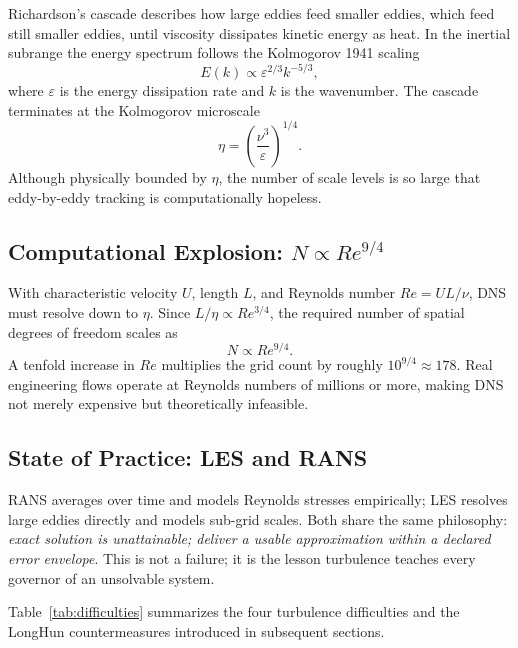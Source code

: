 \documentclass[10pt,a4paper]{article}
\theoremstyle{definition}
\begin{document}
Richardson's cascade describes how large eddies feed smaller eddies, which feed still smaller eddies, until viscosity dissipates kinetic energy as heat. In the inertial subrange the energy spectrum follows the Kolmogorov 1941 scaling\cite{Kolmogorov1941}
\begin{equation}\label{eq:K41}
E(k) \propto \varepsilon^{2/3} k^{-5/3},
\end{equation}
where $\varepsilon$ is the energy dissipation rate and $k$ is the wavenumber. The cascade terminates at the Kolmogorov microscale
\begin{equation}\label{eq:eta}
\eta = \left(\frac{\nu^3}{\varepsilon}\right)^{1/4}.
\end{equation}
Although physically bounded by $\eta$, the number of scale levels is so large that eddy-by-eddy tracking is computationally hopeless.

\subsection{Computational Explosion: $N\propto Re^{9/4}$}

With characteristic velocity $U$, length $L$, and Reynolds number $Re=UL/\nu$, DNS must resolve down to $\eta$. Since $L/\eta\propto Re^{3/4}$, the required number of spatial degrees of freedom scales as
\begin{equation}\label{eq:DNS-cost}
N \propto Re^{9/4}.
\end{equation}
A tenfold increase in $Re$ multiplies the grid count by roughly $10^{9/4}\approx 178$. Real engineering flows operate at Reynolds numbers of millions or more, making DNS not merely expensive but theoretically infeasible.

\subsection{State of Practice: LES and RANS}

RANS averages over time and models Reynolds stresses empirically; LES resolves large eddies directly and models sub-grid scales. Both share the same philosophy: \emph{exact solution is unattainable; deliver a usable approximation within a declared error envelope}. This is not a failure; it is the lesson turbulence teaches every governor of an unsolvable system.

Table~\ref{tab:difficulties} summarizes the four turbulence difficulties and the LongHun countermeasures introduced in subsequent sections.
\end{document}

